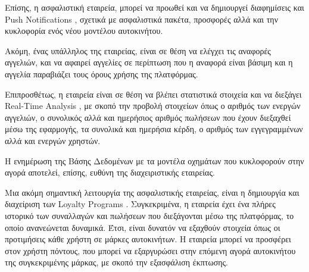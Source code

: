 \documentclass{../ol-softwaremanual}
\begin{document}
	Επίσης, η ασφαλιστική εταιρεία, μπορεί να προωθεί και να δημιουργεί διαφημίσεις και \en Push Notifications \gr, σχετικά με ασφαλιστικά πακέτα, προσφορές αλλά και την κυκλοφορία ενός νέου μοντέλου αυτοκινήτου. \break
	
	Ακόμη, ένας υπάλληλος της εταιρείας, είναι σε θέση να ελέγχει τις αναφορές αγγελιών, και να αφαιρεί αγγελίες σε περίπτωση που η αναφορά είναι βάσιμη και η αγγελία παραβιάζει τους όρους χρήσης της πλατφόρμας. \break
	
	Επιπροσθέτως, η εταιρεία είναι σε θέση να βλέπει στατιστικά στοιχεία και να διεξάγει \en Real-Time Analysis \gr, με σκοπό την προβολή στοιχείων όπως ο αριθμός των ενεργών αγγελιών, ο συνολικός αλλά και ημερήσιος αριθμός πωλήσεων που έχουν διεξαχθεί μέσω της εφαρμογής, τα συνολικά και ημερήσια κέρδη, ο αριθμός των εγγεγραμμένων αλλά και ενεργών χρηστών. \break 
	
	Η ενημέρωση της Βάσης Δεδομένων με τα μοντέλα οχημάτων που κυκλοφορούν στην αγορά αποτελεί, επίσης, ευθύνη της διαχειριστικής εταιρείας. \break
	
	Μια ακόμη σημαντική λειτουργία της ασφαλιστικής εταιρείας, είναι η δημιουργία και διαχείριση των \en Loyalty Programs \gr. Συγκεκριμένα, η εταιρεία έχει ένα πλήρες ιστορικό των συναλλαγών και πωλήσεων που διεξάγονται μέσω της πλατφόρμας, το οποίο ανανεώνεται δυναμικά. Έτσι, είναι δυνατόν να εξαχθούν στοιχεία όπως οι προτιμήσεις κάθε χρήστη σε μάρκες αυτοκινήτων. Η εταιρεία μπορεί να προσφέρει στον χρήστη πόντους, που μπορεί να εξαργυρώσει στην επόμενη αγορά αυτοκινήτου της συγκεκριμένης μάρκας, με σκοπό την εξασφάλιση έκπτωσης. \break 
	
	
	
	\newpage
	
	 \gr
	
	
	
\end{document}
